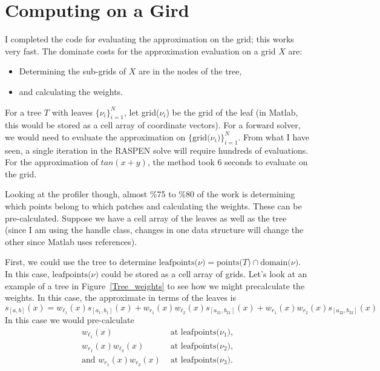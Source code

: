 \documentclass{article}
\begin{document}
\section{Computing on a Gird}
I completed the code for evaluating the approximation on the grid; this works very fast. The dominate costs for the approximation evaluation on a grid $X$ are:
\begin{itemize}
\item Determining the sub-grids of $X$ are in the nodes of the tree,
\item and calculating the weights.
\end{itemize}
For a tree $T$ with leaves $\{\nu_i\}_{i=1}^N$, let grid($\nu_i$) be the grid of the leaf (in Matlab, this would be stored as a cell array of coordinate vectors). For a forward solver, we would need to evaluate the approximation on $\{\text{grid($\nu_i$)}\}_{i=1}^N$. From what I have seen, a single iteration in the RASPEN solve will require hundreds of evaluations. For the approximation of $tan(x+y)$, the method took 6 seconds to evaluate on the grid.

Looking at the profiler though, almost \%75 to \%80 of the work is determining which points belong to which patches and calculating the weights. These can be pre-calculated. Suppose we have a cell array of the leaves as well as the tree (since I am using the handle class, changes in one data structure will change the other since Matlab uses references).

First, we could use the tree to determine $\text{leafpoints($\nu$)}=\text{points($T$)}\cap\text{domain($\nu$)}$. In this case, $\text{leafpoints($\nu$)}$ could be stored as a cell array of grids. Let's look at an example of a tree in Figure~\ref{Tree_weights} to see how we might precalculate the weights. In this case, the approximate in terms of the leaves is
\begin{equation}
s_{[a,b]}(x) =  w_{\ell_1}(x) s_{[a_{1},b_{1}]}(x) +  w_{r_1}(x)  w_{\ell_2}(x) s_{[a_{21},b_{21}]}(x) + w_{r_1}(x) w_{r_2}(x) s_{[a_{22},b_{22}]}(x)
\end{equation}
In this case we would pre-calculate
\begin{equation}
\begin{aligned}
w_{\ell_1}(x) &\text{ at leafpoints($\nu_1$),} \\
w_{r_1}(x)  w_{\ell_2}(x) &\text{ at leafpoints($\nu_2$),} \\
\text{and } w_{r_1}(x) w_{r_2}(x)  &\text{ at leafpoints($\nu_3$).}
\end{aligned}
\end{equation}
\end{document}
